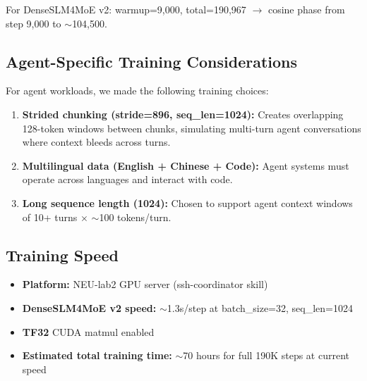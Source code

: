 For DenseSLM4MoE v2: warmup=9,000, total=190,967 $\rightarrow$ cosine phase from step 9,000 to $\sim$104,500.

\subsection{Agent-Specific Training Considerations}

For agent workloads, we made the following training choices:

\begin{enumerate}
    \item \textbf{Strided chunking (stride=896, seq\_len=1024):} Creates overlapping 128-token windows between chunks, simulating multi-turn agent conversations where context bleeds across turns.
    \item \textbf{Multilingual data (English + Chinese + Code):} Agent systems must operate across languages and interact with code.
    \item \textbf{Long sequence length (1024):} Chosen to support agent context windows of 10+ turns $\times$ $\sim$100 tokens/turn.
\end{enumerate}

\subsection{Training Speed}

\begin{itemize}
    \item \textbf{Platform:} NEU-lab2 GPU server (ssh-coordinator skill)
    \item \textbf{DenseSLM4MoE v2 speed:} $\sim$1.3s/step at batch\_size=32, seq\_len=1024
    \item \textbf{TF32} CUDA matmul enabled
    \item \textbf{Estimated total training time:} $\sim$70 hours for full 190K steps at current speed
\end{itemize}
